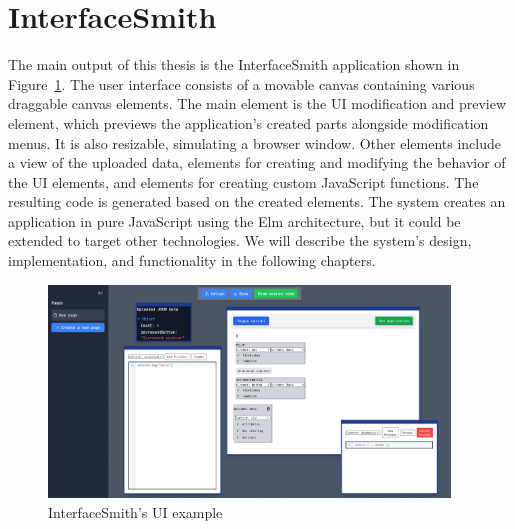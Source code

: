\section*{InterfaceSmith}
\nopagebreak[4]
The main output of this thesis is the InterfaceSmith application shown in Figure~\ref{fig:prototype-teaser}.
The user interface consists of a movable canvas containing various draggable canvas elements.
The main element is the UI modification and preview element, which previews the application's created parts alongside modification menus. It is also resizable, simulating a browser window.
Other elements include a view of the uploaded data, elements for creating and modifying the behavior of the UI elements, and elements for creating custom JavaScript functions.
The resulting code is generated based on the created elements. The system creates an application in pure JavaScript using the Elm architecture\cite{elm-arch}, but it could be extended to target other technologies.
We will describe the system's design, implementation, and functionality in the following chapters.
\begin{figure}
	\begin{center}
		\includegraphics[width=0.95\textwidth]{img/UIExample.pdf}
	\end{center}
	\caption{InterfaceSmith's UI example }
	\label{fig:prototype-teaser}
\end{figure}

\medskip
